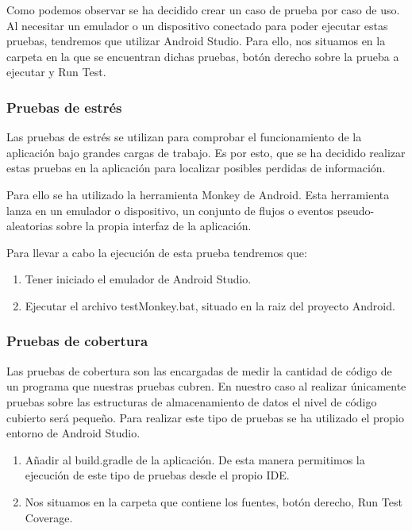 Como podemos observar se ha decidido crear un caso de prueba por caso de uso. Al necesitar un emulador o un dispositivo conectado para poder ejecutar estas pruebas, tendremos que utilizar Android Studio. Para ello,  nos situamos en la carpeta en la que se encuentran dichas pruebas, botón derecho sobre la prueba a ejecutar y Run Test.

\subsubsection{Pruebas de estrés}

Las pruebas de estrés se utilizan para comprobar el funcionamiento de la aplicación bajo grandes cargas de trabajo. Es por esto, que se ha decidido realizar estas pruebas en la aplicación para localizar posibles perdidas de información.

Para ello se ha utilizado la herramienta Monkey de Android. Esta herramienta lanza en un emulador o dispositivo, un conjunto de flujos o eventos pseudo-aleatorias sobre la propia interfaz de la aplicación.

Para llevar a cabo la ejecución de esta prueba tendremos que:

\begin{enumerate}
		\item Tener iniciado el emulador de Android Studio.
	
	\item Ejecutar el archivo testMonkey.bat, situado en la raiz del proyecto Android.

\end{enumerate}

\subsubsection{Pruebas de cobertura}

Las pruebas de cobertura son las encargadas de medir la cantidad de código de un programa que nuestras pruebas cubren. En nuestro caso al realizar únicamente pruebas sobre las estructuras de almacenamiento de datos el nivel de código cubierto será pequeño.
Para realizar este tipo de pruebas se ha utilizado el propio entorno de Android Studio.

\begin{enumerate}

	\item Añadir al build.gradle de la aplicación. 
	De esta manera permitimos la ejecución de este tipo de pruebas desde el propio IDE.
	\item Nos situamos en la carpeta que contiene los fuentes, botón derecho, Run Test Coverage.


\end{enumerate}


